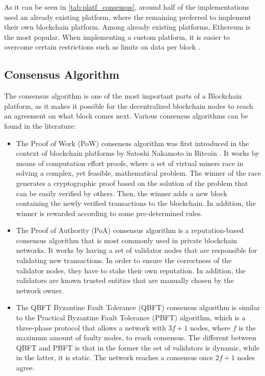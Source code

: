 As it can be seen in \autoref{tab:platf_consensus}, around half of the implementations used an already existing platform, where the remaining preferred to implement their own blockchain platform. Among already existing platforms, Ethereum is the most popular. When implementing a custom platform, it is easier to overcome certain restrictions such as limits on data per block \cite{8733825, 9524833}.

\subsection{Consensus Algorithm}\label{background:consensus_algorithms}

The consensus algorithm is one of the most important parts of a Blockchain platform, as it makes it possible for the decentralized blockchain nodes to reach an agreement on what block comes next. Various consensus algorithms can be found in the literature:

\begin{itemize}
    \item The Proof of Work (PoW) consensus algorithm was first introduced in the context of blockchain platforms by Satoshi Nakamoto in Bitcoin \cite{nakamoto2009bitcoin}. It works by means of computation effort proofs, where a set of virtual miners race in solving a complex, yet feasible, mathematical problem. The winner of the race generates a cryptographic proof based on the solution of the problem that can be easily verified by others. Then, the winner adds a new block containing the newly verified transactions to the blockchain. In addition, the winner is rewarded according to some pre-determined rules.
    
    \item The Proof of Authority (PoA) consensus algorithm is a reputation-based consensus algorithm that is most commonly used in private blockchain networks. It works by having a set of validator nodes that are responsible for validating new transactions. In order to ensure the correctness of the validator nodes, they have to stake their own reputation. In addition, the validators are known trusted entities that are manually chosen by the network owner.

    \item The QBFT Byzantine Fault Tolerance (QBFT) \cite{10.48550/arxiv.2002.03613} consensus algorithm is similar to the Practical Byzantine Fault Tolerance (PBFT) algorithm, which is a three-phase protocol that allows a network with $3f+1$ nodes, where $f$ is the maximum amount of faulty nodes, to reach consensus. The different between QBFT and PBFT is that in the former the set of validators is dynamic, while in the latter, it is static. The network reaches a consensus once $2f+1$ nodes agree.
\end{itemize}

